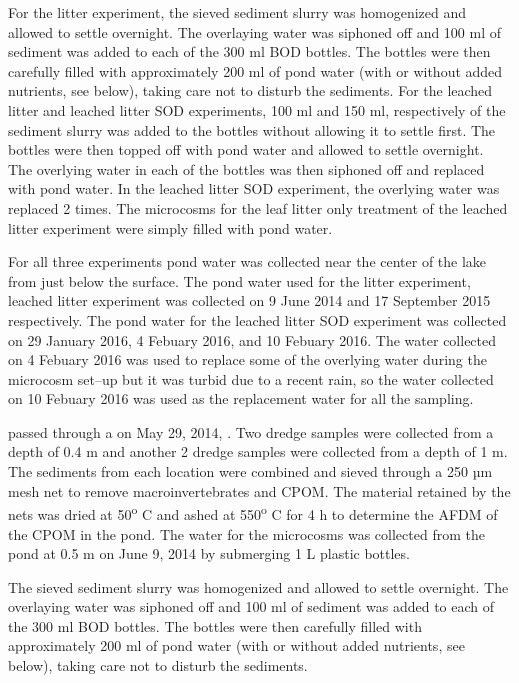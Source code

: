 For the litter experiment, the sieved sediment slurry was homogenized and allowed to settle overnight. The overlaying water was siphoned off and 100 ml of sediment was added to each of the 300 ml BOD bottles. The bottles were then carefully filled with approximately 200 ml of pond water (with or without added nutrients, see below), taking care not to disturb the sediments. For the leached litter and leached litter SOD experiments, 100 ml and 150 ml, respectively of the sediment slurry was added to the bottles without allowing it to settle first. The bottles were then topped off with pond water and allowed to settle overnight. The overlying water in each of the bottles was then siphoned off and replaced with pond water. In the leached litter SOD experiment, the overlying water was replaced 2 times. The microcosms for the leaf litter only treatment of the leached litter experiment were simply filled with pond water.

For all three experiments pond water was collected near the center of the lake from just below the surface.  The pond water used for the litter experiment, leached litter experiment was collected on 9 June 2014 and 17 September 2015 respectively. The pond water for the leached litter SOD experiment was collected on 29 January 2016, 4 Febuary 2016, and 10 Febuary 2016. The water collected on 4 Febuary 2016 was used to replace some of the overlying water during the microcosm set--up but it was turbid due to a recent rain, so the water collected on 10 Febuary 2016 was used as the replacement water for all the sampling.

passed through a  on May 29, 2014, .  Two dredge samples were collected from a depth of 0.4 m and another 2 dredge samples were collected from a depth of 1 m. The sediments from each location were combined and sieved through a 250 µm mesh net to remove macroinvertebrates and CPOM. The material retained by the nets was dried at 50\textsuperscript{o} C and ashed at 550\textsuperscript{o} C for 4 h to determine the AFDM of the CPOM in the pond. The water for the microcosms was  collected from the pond at 0.5 m on June 9, 2014 by submerging 1 L plastic bottles.

The sieved sediment slurry was homogenized and allowed to settle overnight. The overlaying water was siphoned off and 100 ml of sediment was added to each of the 300 ml BOD bottles. The bottles were then carefully filled with approximately 200 ml of pond water (with or without added nutrients, see below), taking care not to disturb the sediments. 

